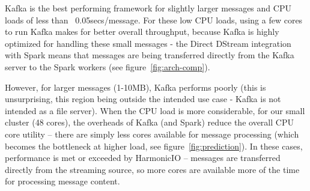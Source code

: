 \documentclass[conference]{IEEEtran}
\begin{document}

Kafka is the best performing framework for slightly larger messages and CPU loads of less than ~0.05secs/message.
For these low CPU loads, using a few cores to run Kafka makes for better overall throughput, because Kafka is highly optimized for handling these small messages - the Direct DStream integration with Spark means that messages are being transferred directly from the Kafka server to the Spark workers (see figure~\ref{fig:arch-comp}).  

However, for larger messages (1-10MB), Kafka performs poorly (this is unsurprising, this region being outside the intended use case - Kafka is not intended as a file server). When the CPU load is more considerable, for our small cluster (48 cores), the overheads of Kafka (and Spark) reduce the overall CPU core utility -- there are simply less cores available for message processing (which becomes the bottleneck at higher load, see figure~\ref{fig:prediction}). In these cases, performance is met or exceeded by HarmonicIO -- messages are transferred directly from the streaming source, so more cores are available more of the time for processing message content.



\end{document}

